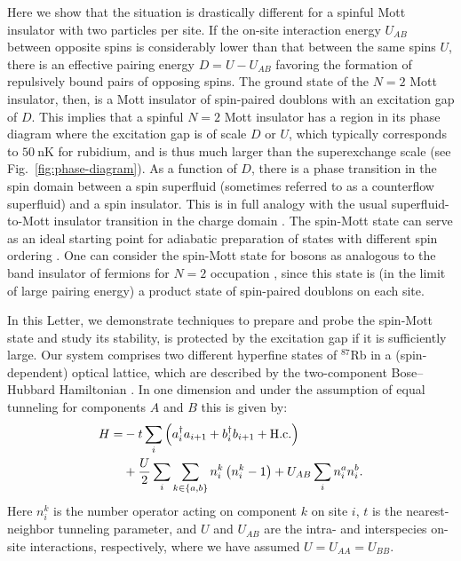 \documentclass[aps,prl,twocolumn]{revtex4-1}
\begin{document}
Here we show that the situation is drastically different for a spinful Mott insulator with two particles per site. If the on-site interaction energy $U_{AB}$ between opposite spins is considerably lower than that between the same spins $U$, there is an effective pairing energy $D=U-U_{AB}$ favoring the formation of repulsively bound pairs of opposing spins. The ground state of the $N=2$ Mott insulator, then, is a Mott insulator of spin-paired doublons with an excitation gap of $D$. This implies that a spinful $N=2$ Mott insulator has a region in its phase diagram where the excitation gap is of scale $D$ or $U$, which typically corresponds to $50~\mathrm{nK}$ for rubidium, and is thus much larger than the superexchange scale (see Fig.~\ref{fig:phase-diagram}). As a function of $D$, there is a phase transition in the spin domain between a spin superfluid (sometimes referred to as a counterflow superfluid) and a spin insulator. This is in full analogy with the usual superfluid-to-Mott insulator transition in the charge domain \cite{Freericks94}.
The spin-Mott state can serve as an ideal starting point for adiabatic preparation of states with different spin ordering \cite{Schachenmayer15}. One can consider the spin-Mott state for bosons as analogous to the band insulator of fermions for $N=2$ occupation \cite{Lubasch11}, since this state is (in the limit of large pairing energy) a product state of spin-paired doublons on each site.


In this Letter, we demonstrate techniques to prepare and probe the spin-Mott state and study its stability, is protected by the excitation gap if it is sufficiently large.
Our system comprises two different hyperfine states of $^{87}$Rb in a (spin-dependent) optical lattice, which are described by the two-component Bose--Hubbard Hamiltonian \cite{Altman03}. In one dimension and under the assumption of equal tunneling for components $A$ and $B$ this is given by:
\begin{align}
    \label{eq:two-comp-hamiltonian}
    H = &-t \sum_{i} \left( a^\dagger_i a_{i+1} + b^\dagger_i b_{i+1} + \mathrm{H.c.} \right) \notag \\
    & + \frac{U}{2} \sum_{i}\sum_{k\in \left\{a, b\right\}} n_i^k \left( n_i^k - 1 \right) + U_{AB} \sum_i n_i^a n_i^b.
\end{align}
Here $n_i^k$ is the number operator acting on component $k$ on site $i$, $t$ is the nearest-neighbor tunneling parameter, and $U$ and $U_{AB}$ are the intra- and interspecies on-site interactions, respectively, where we have assumed $U = U_{AA} = U_{BB}$.
\end{document}
